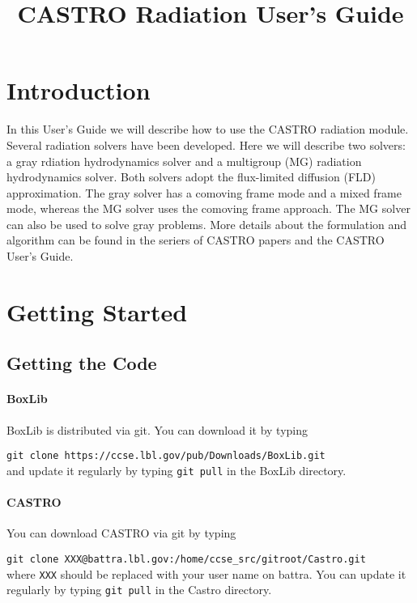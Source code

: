 \documentclass[11pt,letterpaper]{article}
\begin{document}
\title{CASTRO Radiation User's Guide}
\maketitle

\section{Introduction}

In this User's Guide we will describe how to use the CASTRO radiation
module.  Several radiation solvers have been developed.  Here we will
describe two solvers: a gray rdiation hydrodynamics solver and a
multigroup (MG) radiation hydrodynamics solver.  Both solvers adopt
the flux-limited diffusion (FLD) approximation.  The gray solver has a
comoving frame mode and a mixed frame mode, whereas the MG solver uses
the comoving frame approach.  The MG solver can also be used to solve
gray problems.  More details about the formulation and
algorithm can be found in the seriers of CASTRO papers and the CASTRO
User's Guide.

\section{Getting Started}

\subsection{Getting the Code}

\paragraph{BoxLib} BoxLib is distributed via git.  You can download it
by typing
\vspace{5pt}

\verb|git clone https://ccse.lbl.gov/pub/Downloads/BoxLib.git|\\[5pt]
and update it regularly by typing \verb|git pull| in the BoxLib
directory. 

\paragraph{CASTRO} You can download CASTRO via git by typing
\vspace{5pt}

\verb|git clone XXX@battra.lbl.gov:/home/ccse_src/gitroot/Castro.git|\\[5pt]
where {\tt XXX} should be replaced with your user name on battra.  You
can update it regularly by typing \verb|git pull| in the Castro
directory.
\end{document}
